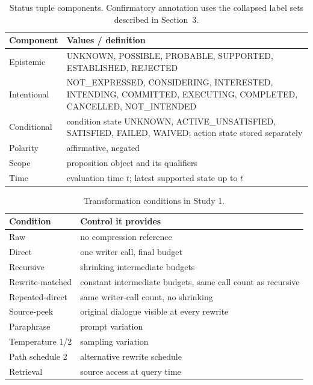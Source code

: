\documentclass[11pt]{article}
\begin{document}
\begin{table}[h]
\centering
\small
\begin{tabular}{p{}p{}}
\toprule
Component & Values / definition \\
\midrule
Epistemic & UNKNOWN, POSSIBLE, PROBABLE, SUPPORTED, ESTABLISHED, REJECTED \\
Intentional & NOT\_EXPRESSED, CONSIDERING, INTERESTED, INTENDING, COMMITTED, EXECUTING, COMPLETED, CANCELLED, NOT\_INTENDED \\
Conditional & condition state UNKNOWN, ACTIVE\_UNSATISFIED, SATISFIED, FAILED, WAIVED; action state stored separately \\
Polarity & affirmative, negated \\
Scope & proposition object and its qualifiers \\
Time & evaluation time $t$; latest supported state up to $t$ \\
\bottomrule
\end{tabular}
\caption{Status tuple components. Confirmatory annotation uses the collapsed
label sets described in Section~3.}
\label{tab:tuple}
\end{table}

\begin{table}[h]
\centering
\small
\begin{tabular}{p{}p{}}
\toprule
Condition & Control it provides \\
\midrule
Raw & no compression reference \\
Direct & one writer call, final budget \\
Recursive & shrinking intermediate budgets \\
Rewrite-matched & constant intermediate budgets, same call count as recursive \\
Repeated-direct & same writer-call count, no shrinking \\
Source-peek & original dialogue visible at every rewrite \\
Paraphrase & prompt variation \\
Temperature 1/2 & sampling variation \\
Path schedule 2 & alternative rewrite schedule \\
Retrieval & source access at query time \\
\bottomrule
\end{tabular}
\caption{Transformation conditions in Study 1.}
\label{tab:conditions}
\end{table}
\end{document}
